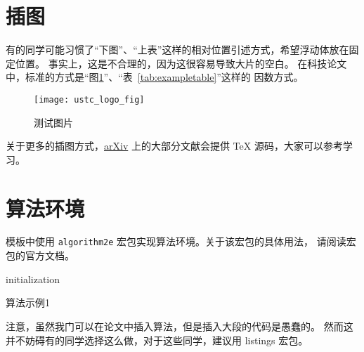 \section{插图}

有的同学可能习惯了“下图”、“上表”这样的相对位置引述方式，希望浮动体放在固定位置。
事实上，这是不合理的，因为这很容易导致大片的空白。
在科技论文中，标准的方式是“图\ref{fig:logo}”、“表~\ref{tab:exampletable}”这样的
因数方式。
\begin{figure}[htbp]
\centering
\texttt{[image: ustc\_logo\_fig]}
\caption{测试图片}
\label{fig:logo}
\end{figure}

关于更多的插图方式，\href{https://arxiv.org}{arXiv} 上的大部分文献会提供 \TeX{}
源码，大家可以参考学习。



\section{算法环境}

模板中使用 \texttt{algorithm2e} 宏包实现算法环境。关于该宏包的具体用法，
请阅读宏包的官方文档。

\begin{algorithm}[htbp]
\small
\SetAlgoLined
{}

initialization\;
\caption{算法示例1}
\label{algo:algorithm1}
\end{algorithm}

注意，虽然我门可以在论文中插入算法，但是插入大段的代码是愚蠢的。
然而这并不妨碍有的同学选择这么做，对于这些同学，建议用 \textsf{listings} 宏包。

